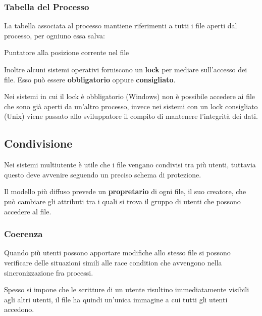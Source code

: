 \subsubsection{Tabella del Processo}
La tabella associata al processo mantiene riferimenti a tutti i file aperti dal processo, per ogniuno essa salva:

\begin{sitemize}
    \item Puntatore alla posizione corrente nel file
\end{sitemize}

\spacer
Inoltre alcuni sistemi operativi forniscono un \textbf{lock} per mediare sull'accesso dei file.
Esso può essere \textbf{obbligatorio} oppure \textbf{consigliato}.

Nei sistemi in cui il lock è obbligatorio (Windows) non è possibile accedere ai file che sono già aperti da un'altro processo, invece nei sistemi con un lock consigliato (Unix) viene passato allo sviluppatore il compito di mantenere l'integrità dei dati.

\subsection{Condivisione}
Nei sistemi multiutente è utile che i file vengano condivisi tra più utenti, tuttavia questo deve avvenire seguendo un preciso schema di protezione.

\spacer
Il modello più diffuso prevede un \textbf{propretario} di ogni file, il suo creatore, che può cambiare gli attributi tra i quali si trova il gruppo di utenti che possono accedere al file.

\subsubsection{Coerenza}
Quando più utenti possono apportare modifiche allo stesso file si possono verificare delle situazioni simili alle race condition che avvengono nella sincronizzazione fra processi.

Spesso si impone che le scritture di un utente risultino immediatamente visibili agli altri utenti, il file ha quindi un'unica immagine a cui tutti gli utenti accedono.
